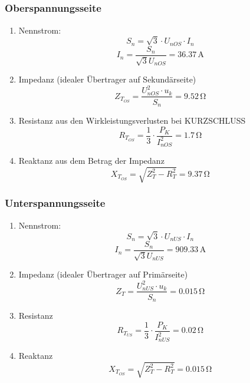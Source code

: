 \documentclass[a4paper]{article}
\begin{document}
\subsection{}
\subsubsection{Oberspannungsseite}
\begin{enumerate}
    \item Nennstrom:
    \[S_{n} = \sqrt{3} \cdot U_{nOS} \cdot I_{n}\]
    \[I_{n} = \frac{S_{n}}{\sqrt{3}U_{nOS}} = 36.37 \, \si{\ampere} \]


    \item Impedanz (idealer Übertrager auf Sekundärseite)
    \[Z_{T_{OS}} = \frac{U_{nOS}^{2} \cdot u_{k}}{S_{n}} = 9.52 \, \si{\ohm}\]

    \item Resistanz aus den Wirkleistungsverlusten bei KURZSCHLUSS
    \[R_{T_{OS}} = \frac{1}{3} \cdot \frac{P_{K}}{I_{nOS}^{2}} = 1.7 \, \si{\ohm}\]

    \item Reaktanz aus dem Betrag der Impedanz
    \[X_{T_{OS}} = \sqrt{Z_{T}^{2} - R_{T}^{2}} = 9.37 \, \si{\ohm}\]

\end{enumerate}

\subsubsection{Unterspannungsseite}
\begin{enumerate}
    \item Nennstrom:
    \[S_{n} = \sqrt{3} \cdot U_{nUS} \cdot I_{n}\]
    \[I_{n} = \frac{S_{n}}{\sqrt{3}U_{nUS}} = 909.33 \, \si{\ampere}\]

    \item Impedanz (idealer Übertrager auf Primärseite)
    \[Z_{T} = \frac{U_{nUS}^{2} \cdot u_{k}}{S_{n}} = 0.015 \, \si{\ohm}\]

    \item Resistanz
    \[R_{T_{US}} = \frac{1}{3} \cdot \frac{P_{K}}{I_{nUS}^{2}} = 0.02 \, \si{\ohm}\]

    \item Reaktanz
    \[X_{T_{OS}} = \sqrt{Z_{T}^{2} - R_{T}^{2}} = 0.015 \, \si{\ohm}\]

\end{enumerate}

\subsection{}
\end{document}
